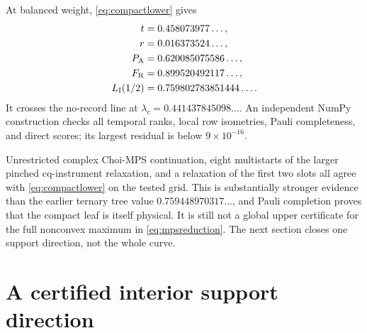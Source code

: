 \documentclass[10pt,twocolumn]{article}
\theoremstyle{remark}
\newcommand{\PA}{P_{\mathrm A}}
\newcommand{\FR}{F_{\mathrm R}}
\begin{document}
At balanced weight, \eqref{eq:compactlower} gives
\begin{align}
t&=0.458073977\ldots,\notag\\
r&=0.016373524\ldots,\notag\\
\PA&=0.620085075586\ldots,\notag\\
\FR&=0.899520492117\ldots,\notag\\
L_{\rm I}(1/2)&=0.759802783851444\ldots .
\label{eq:balancedcompact}
\end{align}
It crosses the no-record line at
$\lambda_c=0.441437845098\ldots$. An independent NumPy construction checks
all temporal ranks, local row isometries, Pauli completeness, and direct
scores; its largest residual is below $9\times10^{-16}$.

Unrestricted complex Choi-MPS continuation, eight multistarts of the larger
pinched cq-instrument relaxation, and a relaxation of the first two slots all
agree with \eqref{eq:compactlower} on the tested grid. This is substantially
stronger evidence than the earlier ternary tree value
$0.759448970317\ldots$, and Pauli completion proves that the compact leaf is
itself physical. It is still not a global upper certificate for
the full nonconvex maximum in \eqref{eq:mpsreduction}. The next section closes
one support direction, not the whole curve.

\section{A certified interior support direction}
\label{sec:globalcertificate}
\end{document}
